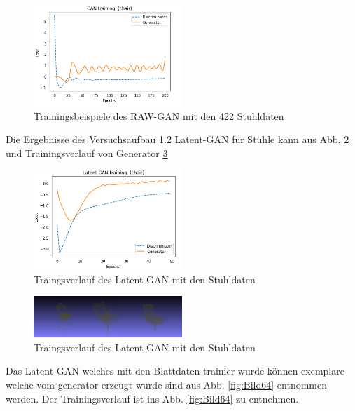 \documentclass{llncs}
\begin{document}
\begin{figure}[htbp] 
	\centering
	\includegraphics[width=0.5\textwidth]{raw_gan_result_400_examples.png}
	\caption{Trainingsbeispiele des RAW-GAN mit den 422 Stuhldaten}
	\label{fig:Bild60}
\end{figure}

Die Ergebnisse des Versuchsaufbau 1.2 Latent-GAN für Stühle kann aus Abb. \ref{fig:Bild61} und Trainingsverlauf von Generator \ref{fig:Bild62}

\begin{figure}[htbp] 
	\centering
	\includegraphics[width=0.5\textwidth]{latent_gan_chair_result.png}
	\caption{Traingsverlauf des Latent-GAN mit den Stuhldaten}
	\label{fig:Bild61}
\end{figure}

\begin{figure}[htbp] 
	\centering
	\includegraphics[width=0.5\textwidth]{latent_gan_chair_example.png}
	\caption{Traingsverlauf des Latent-GAN mit den Stuhldaten}
	\label{fig:Bild62}
\end{figure}


Das Latent-GAN welches mit den Blattdaten trainier wurde können exemplare welche vom generator erzeugt wurde sind aus Abb. \ref{fig:Bild64} entnommen werden. Der Trainingsverlauf ist ins Abb. \ref{fig:Bild64} zu entnehmen.
\end{document}
